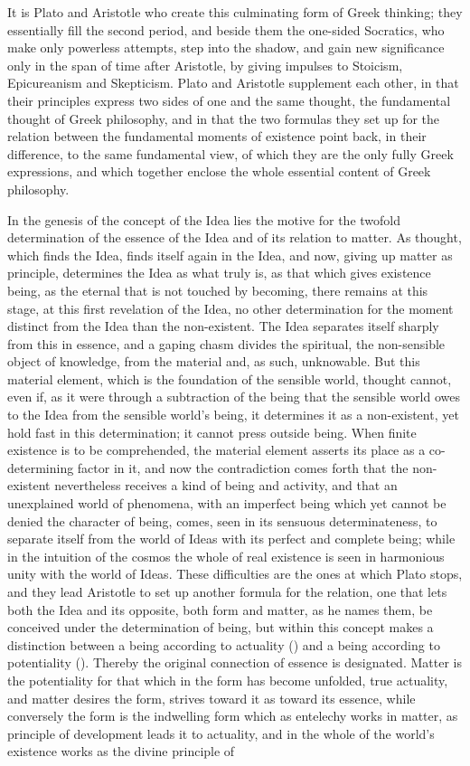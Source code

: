 It is Plato and Aristotle who create this culminating form of Greek thinking; they essentially fill the second period, and beside them the one-sided Socratics, who make only powerless attempts, step into the shadow, and gain new significance only in the span of time after Aristotle, by giving impulses to Stoicism, Epicureanism and Skepticism. Plato and Aristotle supplement each other, in that their principles express two sides of one and the same thought, the fundamental thought of Greek philosophy, and in that the two formulas they set up for the relation between the fundamental moments of existence point back, in their difference, to the same fundamental view, of which they are the only fully Greek expressions, and which together enclose the whole essential content of Greek philosophy.

In the genesis of the concept of the Idea lies the motive for the twofold determination of the essence of the Idea and of its relation to matter. As thought, which finds the Idea, finds itself again in the Idea, and now, giving up matter as principle, determines the Idea as what truly is, as that which gives existence being, as the eternal that is not touched by becoming, there remains at this stage, at this first revelation of the Idea, no other determination for the moment distinct from the Idea than the non-existent. The Idea separates itself sharply from this in essence, and a gaping chasm divides the spiritual, the non-sensible object of knowledge, from the material and, as such, unknowable. But this material element, which is the foundation of the sensible world, thought cannot, even if, as it were through a subtraction of the being that the sensible world owes to the Idea from the sensible world's being, it determines it as a non-existent, yet hold fast in this determination; it cannot press outside being. When finite existence is to be comprehended, the material element asserts its place as a co-determining factor in it, and now the contradiction comes forth that the non-existent nevertheless receives a kind of being and activity, and that an unexplained world of phenomena, with an imperfect being which yet cannot be denied the character of being, comes, seen in its sensuous determinateness, to separate itself from the world of Ideas with its perfect and complete being; while in the intuition of the cosmos the whole of real existence is seen in harmonious unity with the world of Ideas. These difficulties are the ones at which Plato stops, and they lead Aristotle to set up another formula for the relation, one that lets both the Idea and its opposite, both form and matter, as he names them, be conceived under the determination of being, but within this concept makes a distinction between a being according to actuality () and a being according to potentiality (). Thereby the original connection of essence is designated. Matter is the potentiality for that which in the form has become unfolded, true actuality, and matter desires the form, strives toward it as toward its essence, while conversely the form is the indwelling form which as entelechy works in matter, as principle of development leads it to actuality, and in the whole of the world's existence works as the divine principle of 